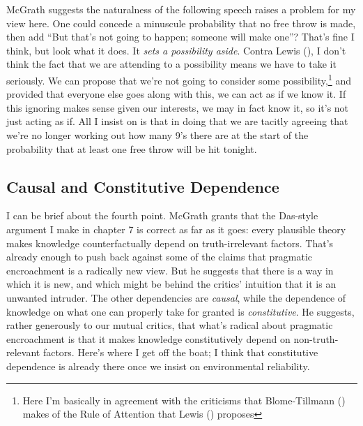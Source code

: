 \documentclass[
  11pt,
  letterpaper,
  DIV=11,
  numbers=noendperiod,
  twoside]{scrartcl}
\begin{document}
McGrath suggests the naturalness of the following speech raises a
problem for my view here. One could concede a minuscule probability that
no free throw is made, then add ``But that's not going to happen;
someone will make one''? That's fine I think, but look what it does. It
\emph{sets a possibility aside}. Contra Lewis
(), I don't think the fact that we are
attending to a possibility means we have to take it seriously. We can
propose that we're not going to consider some possibility,\footnote{Here
  I'm basically in agreement with the criticisms that Blome-Tillmann
  () makes of the Rule of Attention that
  Lewis () proposes} and provided that
everyone else goes along with this, we can act as if we know it. If this
ignoring makes sense given our interests, we may in fact know it, so
it's not just acting as if. All I insist on is that in doing that we are
tacitly agreeing that we're no longer working out how many 9's there are
at the start of the probability that at least one free throw will be hit
tonight.

\subsection{Causal and Constitutive
Dependence}\label{sec-mcgrath-constitutive}

I can be brief about the fourth point. McGrath grants that the Das-style
argument I make in chapter 7 is correct as far as it goes: every
plausible theory makes knowledge counterfactually depend on
truth-irrelevant factors. That's already enough to push back against
some of the claims that pragmatic encroachment is a radically new view.
But he suggests that there is a way in which it is new, and which might
be behind the critics' intuition that it is an unwanted intruder. The
other dependencies are \emph{causal}, while the dependence of knowledge
on what one can properly take for granted is \emph{constitutive}. He
suggests, rather generously to our mutual critics, that what's radical
about pragmatic encroachment is that it makes knowledge constitutively
depend on non-truth-relevant factors. Here's where I get off the boat; I
think that constitutive dependence is already there once we insist on
environmental reliability.
\end{document}
